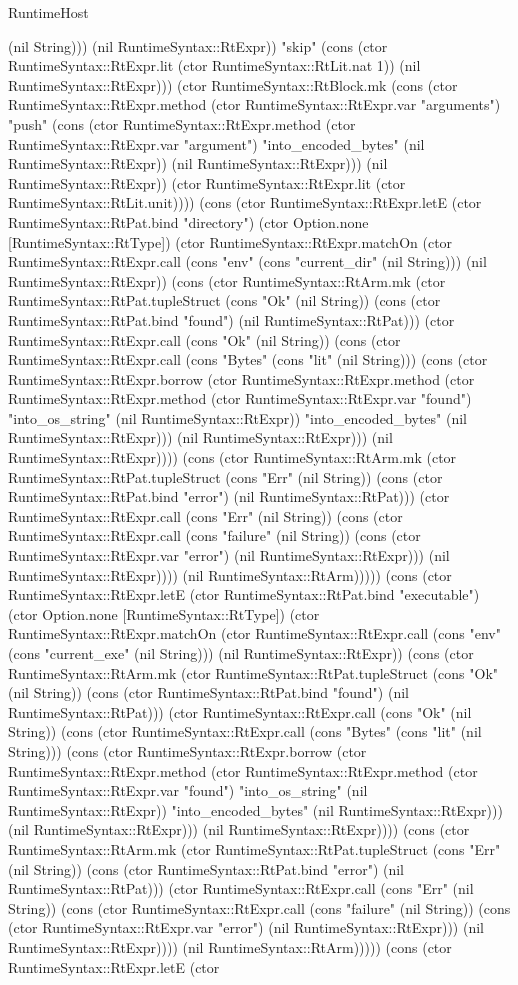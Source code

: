 \begin{lexlean}{RuntimeHost}
\begin{semanticmodule}
{(nil String))) (nil RuntimeSyntax::RtExpr)) "skip" (cons (ctor RuntimeSyntax::RtExpr.lit (ctor RuntimeSyntax::RtLit.nat 1)) (nil RuntimeSyntax::RtExpr))) (ctor RuntimeSyntax::RtBlock.mk (cons (ctor RuntimeSyntax::RtExpr.method (ctor RuntimeSyntax::RtExpr.var "arguments") "push" (cons (ctor RuntimeSyntax::RtExpr.method (ctor RuntimeSyntax::RtExpr.var "argument") "into_encoded_bytes" (nil RuntimeSyntax::RtExpr)) (nil RuntimeSyntax::RtExpr))) (nil RuntimeSyntax::RtExpr)) (ctor RuntimeSyntax::RtExpr.lit (ctor RuntimeSyntax::RtLit.unit)))) (cons (ctor RuntimeSyntax::RtExpr.letE (ctor RuntimeSyntax::RtPat.bind "directory") (ctor Option.none [RuntimeSyntax::RtType]) (ctor RuntimeSyntax::RtExpr.matchOn (ctor RuntimeSyntax::RtExpr.call (cons "env" (cons "current_dir" (nil String))) (nil RuntimeSyntax::RtExpr)) (cons (ctor RuntimeSyntax::RtArm.mk (ctor RuntimeSyntax::RtPat.tupleStruct (cons "Ok" (nil String)) (cons (ctor RuntimeSyntax::RtPat.bind "found") (nil RuntimeSyntax::RtPat))) (ctor RuntimeSyntax::RtExpr.call (cons "Ok" (nil String)) (cons (ctor RuntimeSyntax::RtExpr.call (cons "Bytes" (cons "lit" (nil String))) (cons (ctor RuntimeSyntax::RtExpr.borrow (ctor RuntimeSyntax::RtExpr.method (ctor RuntimeSyntax::RtExpr.method (ctor RuntimeSyntax::RtExpr.var "found") "into_os_string" (nil RuntimeSyntax::RtExpr)) "into_encoded_bytes" (nil RuntimeSyntax::RtExpr))) (nil RuntimeSyntax::RtExpr))) (nil RuntimeSyntax::RtExpr)))) (cons (ctor RuntimeSyntax::RtArm.mk (ctor RuntimeSyntax::RtPat.tupleStruct (cons "Err" (nil String)) (cons (ctor RuntimeSyntax::RtPat.bind "error") (nil RuntimeSyntax::RtPat))) (ctor RuntimeSyntax::RtExpr.call (cons "Err" (nil String)) (cons (ctor RuntimeSyntax::RtExpr.call (cons "failure" (nil String)) (cons (ctor RuntimeSyntax::RtExpr.var "error") (nil RuntimeSyntax::RtExpr))) (nil RuntimeSyntax::RtExpr)))) (nil RuntimeSyntax::RtArm))))) (cons (ctor RuntimeSyntax::RtExpr.letE (ctor RuntimeSyntax::RtPat.bind "executable") (ctor Option.none [RuntimeSyntax::RtType]) (ctor RuntimeSyntax::RtExpr.matchOn (ctor RuntimeSyntax::RtExpr.call (cons "env" (cons "current_exe" (nil String))) (nil RuntimeSyntax::RtExpr)) (cons (ctor RuntimeSyntax::RtArm.mk (ctor RuntimeSyntax::RtPat.tupleStruct (cons "Ok" (nil String)) (cons (ctor RuntimeSyntax::RtPat.bind "found") (nil RuntimeSyntax::RtPat))) (ctor RuntimeSyntax::RtExpr.call (cons "Ok" (nil String)) (cons (ctor RuntimeSyntax::RtExpr.call (cons "Bytes" (cons "lit" (nil String))) (cons (ctor RuntimeSyntax::RtExpr.borrow (ctor RuntimeSyntax::RtExpr.method (ctor RuntimeSyntax::RtExpr.method (ctor RuntimeSyntax::RtExpr.var "found") "into_os_string" (nil RuntimeSyntax::RtExpr)) "into_encoded_bytes" (nil RuntimeSyntax::RtExpr))) (nil RuntimeSyntax::RtExpr))) (nil RuntimeSyntax::RtExpr)))) (cons (ctor RuntimeSyntax::RtArm.mk (ctor RuntimeSyntax::RtPat.tupleStruct (cons "Err" (nil String)) (cons (ctor RuntimeSyntax::RtPat.bind "error") (nil RuntimeSyntax::RtPat))) (ctor RuntimeSyntax::RtExpr.call (cons "Err" (nil String)) (cons (ctor RuntimeSyntax::RtExpr.call (cons "failure" (nil String)) (cons (ctor RuntimeSyntax::RtExpr.var "error") (nil RuntimeSyntax::RtExpr))) (nil RuntimeSyntax::RtExpr)))) (nil RuntimeSyntax::RtArm))))) (cons (ctor RuntimeSyntax::RtExpr.letE (ctor }
\end{semanticmodule}
\end{lexlean}
